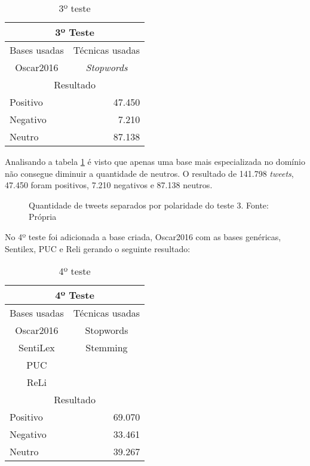 \begin{table}[H]
	\centering
	\caption{3º teste}
	\label{teste-3}
	\begin{tabular}{|l|l|r|}
		\hline
		\multicolumn{3}{|c|}{3º Teste} \\ \hline
		\multicolumn{2}{|l|}{Bases usadas} & Técnicas usadas \\ \hline
		\multicolumn{2}{|c|}{Oscar2016} & \multicolumn{1}{c|}{\textit{Stopwords}} \\ \hline
		\multicolumn{3}{|c|}{Resultado} \\ \hline
		\multicolumn{2}{|l|}{Positivo} & 47.450 \\ \hline
		\multicolumn{2}{|l|}{Negativo} & 7.210 \\ \hline
		\multicolumn{2}{|l|}{Neutro} & 87.138 \\ \hline
	\end{tabular}
\end{table}


Analisando a tabela \ref{teste-3} é visto que apenas uma base mais especializada no domínio não consegue diminuir a quantidade de neutros. O resultado de 141.798 \textit{tweets}, 47.450 foram positivos, 7.210 negativos e 87.138 neutros.

\begin{figure}[H]
	\centering{}
	\caption{Quantidade de tweets separados por polaridade do teste 3. Fonte: Própria}
	\label{teste-graf-3}
\end{figure}

No 4º teste foi adicionada a base criada, Oscar2016 com as bases genéricas, Sentilex, PUC e  Reli  gerando o seguinte resultado:

\begin{table}[H]
	\centering
	\caption{4º teste}
	\label{teste-4}
	\begin{tabular}{|c|l|r}
		\hline
		\multicolumn{3}{|c|}{4º Teste} \\ \hline
		\multicolumn{2}{|l|}{Bases usadas} & \multicolumn{1}{r|}{Técnicas usadas} \\ \hline
		\multicolumn{2}{|c|}{Oscar2016} & \multicolumn{1}{c|}{Stopwords} \\
		\multicolumn{2}{|c|}{SentiLex} & \multicolumn{1}{c|}{Stemming} \\ \cline{3-3} 
		\multicolumn{2}{|c|}{PUC} & \multicolumn{1}{c}{} \\
		\multicolumn{2}{|c|}{ReLi} & \multicolumn{1}{c}{} \\ \hline
		\multicolumn{3}{|c|}{Resultado} \\ \hline
		\multicolumn{2}{|l|}{Positivo} & \multicolumn{1}{r|}{69.070} \\ \hline
		\multicolumn{2}{|l|}{Negativo} & \multicolumn{1}{r|}{33.461} \\ \hline
		\multicolumn{2}{|l|}{Neutro} & \multicolumn{1}{r|}{39.267} \\ \hline
	\end{tabular}
\end{table}


